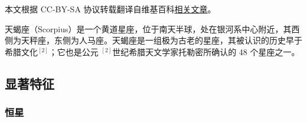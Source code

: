 
本文根据 CC-BY-SA 协议转载翻译自维基百科\href{https://en.wikipedia.org/wiki/Scorpius}{相关文章}。

天蝎座（Scorpius）是一个黄道星座，位于南天半球，处在银河系中心附近，其西侧为天秤座，东侧为人马座。天蝎座是一组极为古老的星座，其被认识的历史早于希腊文化$^{[2]}$；它也是公元 $^{[2]}$世纪希腊天文学家托勒密所确认的 48 个星座之一。
\subsection{显著特征}  
\subsubsection{恒星}
